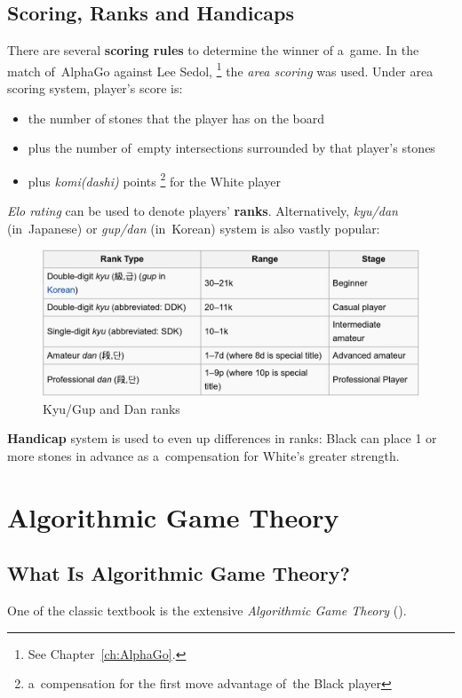 \subsection{Scoring, Ranks and Handicaps}

There are several \textbf{scoring rules} to determine the winner of a~game.
In the match of~AlphaGo against Lee Sedol,%
\footnote{See Chapter~\ref{ch:AlphaGo}.}
the \emph{area scoring} was used.
Under area scoring system, player's score is:
\begin{itemize}
  \item the number of stones that the player has on the board
  \item plus the number of~empty intersections surrounded by that player's stones
  \item plus \emph{komi(dashi)} points%
    \footnote{a~compensation for the first move advantage of~the Black player}
    for the White player
\end{itemize}

\emph{Elo rating} can be used to denote players' \textbf{ranks}.
Alternatively, \emph{kyu/dan} (in~Japanese) or \emph{gup/dan} (in~Korean) system is also vastly popular:
\begin{figure}[H]
  \centering
  \includegraphics[width=.8\textwidth]{../img/Go_kyu_dan.png}
  \caption{Kyu/Gup and Dan ranks}
  \label{fig:Go-ranks}
\end{figure}

\textbf{Handicap} system is used to even up differences in ranks:
Black can place 1 or more stones in advance as a~compensation for White's greater strength.

\section{Algorithmic Game Theory}

\subsection{What Is Algorithmic Game Theory?}
One of the classic textbook is the extensive \emph{Algorithmic Game Theory} (\cite{AGT07}).
\todo

